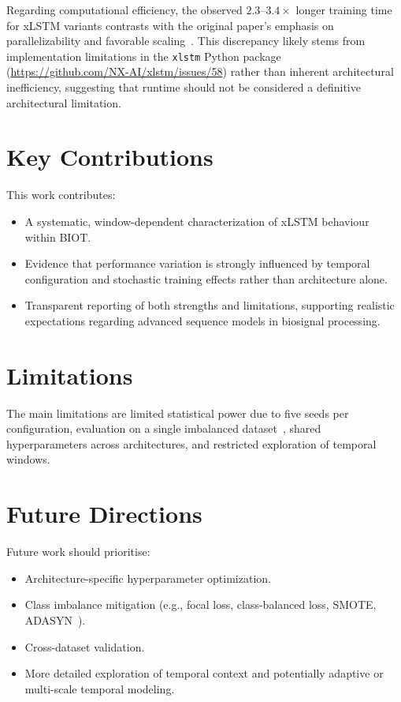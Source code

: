Regarding computational efficiency, the observed $2.3$--$3.4\times$ longer training time for \ac{xLSTM} variants contrasts with the original paper's emphasis on parallelizability and favorable scaling~\cite{beck2024xlstm}. This discrepancy likely stems from implementation limitations in the \texttt{xlstm} Python package (\url{https://github.com/NX-AI/xlstm/issues/58}) rather than inherent architectural inefficiency, suggesting that runtime should not be considered a definitive architectural limitation.

\section{Key Contributions}

This work contributes:
\begin{itemize}
\item A systematic, window-dependent characterization of \ac{xLSTM} behaviour within \ac{BIOT}.
\item Evidence that performance variation is strongly influenced by temporal configuration and stochastic training effects rather than architecture alone.
\item Transparent reporting of both strengths and limitations, supporting realistic expectations regarding advanced sequence models in biosignal processing.
\end{itemize}

\section{Limitations}

The main limitations are limited statistical power due to five seeds per configuration, evaluation on a single imbalanced dataset~\cite{harati2015improved,obeid2016temple}, shared hyperparameters across architectures, and restricted exploration of temporal windows.

\section{Future Directions}

Future work should prioritise:
\begin{itemize}
\item Architecture-specific hyperparameter optimization.
\item Class imbalance mitigation (e.g., focal loss, class-balanced loss, SMOTE, ADASYN~\cite{cui2019class,lin2017focal,chawla2002smote,he2008adasyn}).
\item Cross-dataset validation.
\item More detailed exploration of temporal context and potentially adaptive or multi-scale temporal modeling.
\end{itemize}

